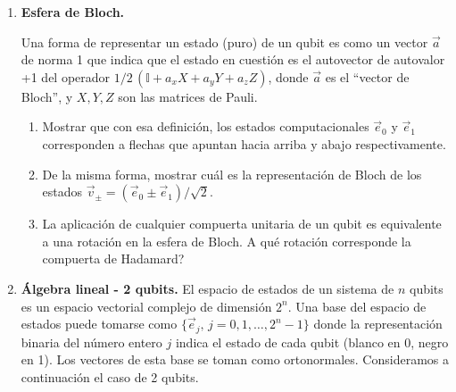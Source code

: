 \documentclass[a4paper,11pt,spanish]{article}
\begin{document}
\begin{enumerate}
\begin{enumerate}
  \item Hallar los vectores y valores propios de $Y$.
  
  \item Probar que se satisface $XY = -YX$, $YZ = -ZY$ (ya sab\'iamos que $ZX=-XZ$); se dice que las matrices de Pauli ``anticonmutan''.
  
  \item Verificar que $XY = {\rm i} Z$, $Y Z = {\rm i} X$, $ZX = {\rm i} Y$ (notar que el orden de los operadores cambia c\'iclicamente).
  
  \item Mostrar que $HYH=-Y$.
 \end{enumerate}
\smallskip

\item {\bf Esfera de Bloch.}

Una forma de representar un estado (puro) de un qubit es como un vector $\vec a$ de norma 1 que indica que el estado en cuestión es el autovector de autovalor +1 del operador $1/2\, (\mathbb{I} + a_x X + a_y Y + a_z Z)$, donde $\vec a$ es el
``vector de Bloch'', y $X, Y, Z$ son las matrices de Pauli.
\begin{enumerate}
 \item Mostrar que con esa definición, los estados computacionales $\vec e_0$ y $\vec e_1$ corresponden a flechas que apuntan hacia arriba y abajo respectivamente.
 \item De la misma forma, mostrar cuál es la representación de Bloch de los estados $\vec v_{\pm} = (\vec e_0 \pm \vec e_1)/\sqrt{2}$.
 \item La aplicación de cualquier compuerta unitaria de un qubit es equivalente a una rotación en la esfera de Bloch. \textquestiondown A qué rotación corresponde la compuerta de Hadamard?
\end{enumerate}

\smallskip


\item {\bf \'Algebra lineal - 2 qubits.} El espacio de estados de un sistema de $n$ qubits es un espacio vectorial complejo de dimensi\'on $2^n$. Una base del espacio de estados puede tomarse como $\{\vec e_j,\, j=0,1,\ldots, 2^n-1\}$ donde la representaci\'on binaria del n\'umero entero $j$ indica el estado de cada qubit (blanco en 0, negro en 1). Los vectores de esta base se toman como ortonormales. Consideramos a continuaci\'on el caso de 2 qubits.
  

\end{enumerate}
\end{document}
